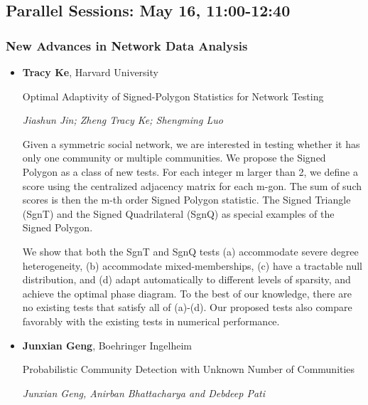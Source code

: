 
\subsection*{Parallel Sessions: May 16, 11:00-12:40}

\subsubsection*{New Advances in Network Data Analysis}

\begin{itemize}
\item \textbf{Tracy Ke}, Harvard University

Optimal Adaptivity of Signed-Polygon Statistics for Network Testing

\emph{\footnotesize Jiashun Jin; Zheng Tracy Ke; Shengming Luo}

Given a symmetric social network, we are interested in testing whether it has only one community or multiple  communities.  We propose the Signed Polygon as a class of new tests. For each integer m larger than 2, we define a score using the centralized adjacency matrix for each m-gon. The sum of such scores is then the m-th order Signed Polygon statistic. The Signed Triangle (SgnT) and the Signed Quadrilateral (SgnQ) as special examples of the Signed Polygon.  


We show that both the SgnT and SgnQ tests (a) accommodate severe degree heterogeneity, (b) accommodate mixed-memberships, (c) have a tractable null distribution, and (d)  adapt automatically to different levels of sparsity, and achieve the optimal phase diagram. To the best of our knowledge, there are no existing tests that satisfy all of (a)-(d). Our proposed tests also compare favorably with the existing tests in numerical performance.  


\item \textbf{Junxian Geng}, Boehringer Ingelheim

Probabilistic Community Detection with Unknown Number of Communities

\emph{\footnotesize Junxian Geng, Anirban Bhattacharya and Debdeep Pati}


\end{itemize}
